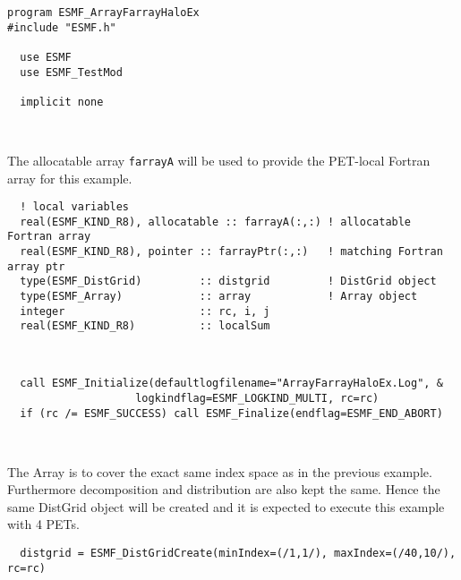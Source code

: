 \begin{verbatim}
program ESMF_ArrayFarrayHaloEx
#include "ESMF.h"

  use ESMF
  use ESMF_TestMod
  
  implicit none
  
 
\end{verbatim}
 

   The allocatable array {\tt farrayA} will be used to provide the PET-local
   Fortran array for this example. 

 \begin{verbatim}
  ! local variables
  real(ESMF_KIND_R8), allocatable :: farrayA(:,:) ! allocatable Fortran array
  real(ESMF_KIND_R8), pointer :: farrayPtr(:,:)   ! matching Fortran array ptr
  type(ESMF_DistGrid)         :: distgrid         ! DistGrid object
  type(ESMF_Array)            :: array            ! Array object
  integer                     :: rc, i, j
  real(ESMF_KIND_R8)          :: localSum
  
 
\end{verbatim}
 

 \begin{verbatim}
  call ESMF_Initialize(defaultlogfilename="ArrayFarrayHaloEx.Log", &
                    logkindflag=ESMF_LOGKIND_MULTI, rc=rc)
  if (rc /= ESMF_SUCCESS) call ESMF_Finalize(endflag=ESMF_END_ABORT)
  
 
\end{verbatim}
 

   The Array is to cover the exact same index space as in the previous
   example. Furthermore decomposition and distribution are also kept the same.
   Hence the same DistGrid object will be created and it is expected to 
   execute this example with 4 PETs.
   

 \begin{verbatim}
  distgrid = ESMF_DistGridCreate(minIndex=(/1,1/), maxIndex=(/40,10/), rc=rc)
 
\end{verbatim}
 

